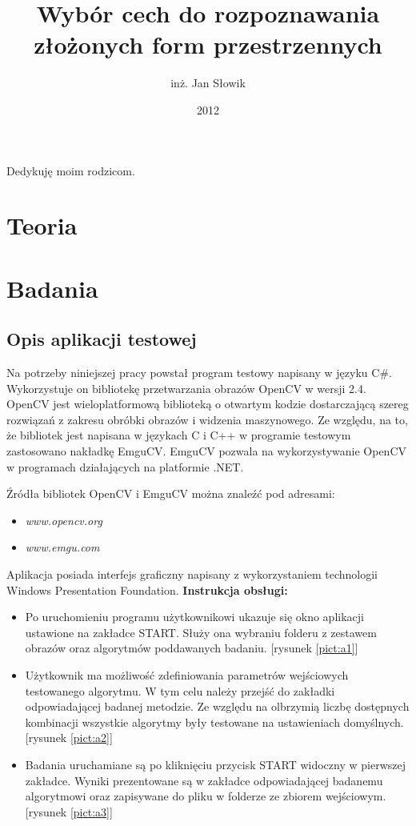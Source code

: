 \documentclass[oneside]{mgr}
\title{Wybór cech do rozpoznawania \\złożonych form przestrzennych}
\author{inż. Jan Słowik}
\date{2012}
\begin{document}
 
\maketitle 
\dedication{6cm}{Dedykuję moim rodzicom.}
\tableofcontents 


\part{Teoria}

\part{Badania}





\appendix
\chapter{Opis aplikacji testowej}
\label{dodatek_opis_aplikacji}
Na potrzeby niniejszej pracy powstał program testowy napisany w języku C\#. Wykorzystuje on bibliotekę przetwarzania obrazów OpenCV w wersji 2.4. OpenCV jest wieloplatformową biblioteką o otwartym kodzie dostarczającą szereg rozwiązań z zakresu obróbki obrazów i widzenia maszynowego. Ze względu, na to, że bibliotek jest napisana w językach C i C++ w programie testowym zastosowano nakładkę EmguCV. EmguCV pozwala na wykorzystywanie OpenCV w programach działających na platformie .NET. 

Źródła bibliotek OpenCV i EmguCV można znaleźć pod adresami:
\begin{itemize}
\item \textit{www.opencv.org}
\item \textit{www.emgu.com}
\end{itemize}

Aplikacja posiada interfejs graficzny napisany z wykorzystaniem technologii Windows Presentation Foundation. \newline
\newline
\textbf{Instrukcja obsługi:}


\begin{itemize}
\item Po uruchomieniu programu użytkownikowi ukazuje się okno aplikacji ustawione na zakładce START. Służy ona wybraniu folderu z zestawem obrazów oraz algorytmów poddawanych badaniu. {[rysunek \ref{pict:a1}]}

\item Użytkownik ma możliwość zdefiniowania parametrów wejściowych testowanego algorytmu. W tym celu należy przejść do zakładki odpowiadającej badanej metodzie.  Ze względu na olbrzymią liczbę dostępnych kombinacji wszystkie algorytmy były testowane na ustawieniach domyślnych. {[rysunek \ref{pict:a2}]}

\item Badania uruchamiane są po kliknięciu przycisk START widoczny w pierwszej zakładce. Wyniki prezentowane są w zakładce odpowiadającej badanemu algorytmowi oraz zapisywane do pliku w folderze ze zbiorem wejściowym. {[rysunek \ref{pict:a3}]}
\end{itemize}
\end{document}
